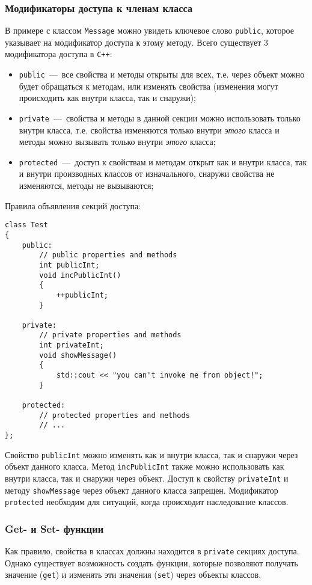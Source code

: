 \subsubsection{Модификаторы доступа к членам класса}
В примере с классом \lstinline{Message} можно увидеть ключевое слово \lstinline|public|, которое указывает на модификатор доступа к этому методу. Всего существует 3 модификатора доступа в \texttt{C++}:

\begin{itemize}
    \item \lstinline|public|~---~все свойства и методы открыты для всех, т.е. через объект можно будет обращаться к методам, или изменять свойства (изменения могут происходить как внутри класса, так и снаружи);
    \item \lstinline|private|~---~свойства и методы в данной секции можно использовать только внутри класса, т.е. свойства изменяются только внутри \emph{этого} класса и методы можно вызывать только внутри \emph{этого} класса;
    \item \lstinline|protected|~---~доступ к свойствам и методам открыт как и внутри класса, так и внутри производных классов от изначального, снаружи свойства не изменяются, методы не вызываются;
\end{itemize}

Правила объявления секций доступа:
\begin{lstlisting}
class Test
{
    public:
        // public properties and methods
        int publicInt;
        void incPublicInt()
        {
            ++publicInt;
        }

    private:
        // private properties and methods
        int privateInt;
        void showMessage()
        {
            std::cout << "you can't invoke me from object!";
        }

    protected:
        // protected properties and methods
        // ...
};
\end{lstlisting}

Свойство \lstinline|publicInt| можно изменять как и внутри класса, так и снаружи через объект данного класса. Метод \lstinline|incPublicInt| также можно использовать как внутри класса, так и снаружи через объект. Доступ к свойству \lstinline|privateInt| и методу \lstinline|showMessage| через объект данного класса запрещен. Модификатор \lstinline|protected| необходим для ситуаций, когда происходит наследование классов.

\subsubsection{Get- и Set- функции}
Как правило, свойства в классах должны находится в \lstinline|private| секциях доступа. Однако существует возможность создать функции, которые позволяют получать значение (\lstinline|get|) и изменять эти значения (\lstinline|set|) через объекты классов.

